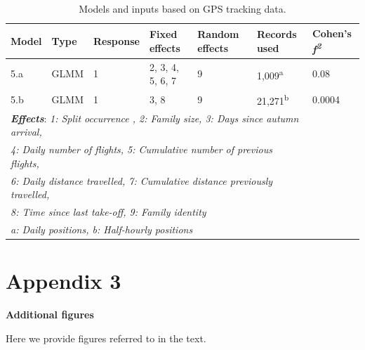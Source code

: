 \documentclass[10pt,twocolumn]{paper}
\begin{document}
\begin{table}[H]
\begin{tabular}{l*6l}
\toprule
Model & Type & Response & Fixed effects & Random effects & Records used & Cohen's \emph{f\textsuperscript{2}}\\
\midrule
5.a & GLMM & 1 & 2, 3, 4, 5, 6, 7 & 9 & 1,009\textsuperscript{a} & 0.08 \\

5.b & GLMM & 1 & 3, 8 & 9 & 21,271\textsuperscript{b} & 0.0004\\
\midrule
\multicolumn{6}{l}{\textbf{\emph{Effects}}: \emph{1: Split occurrence , 2: Family size, 3: Days since autumn arrival,}}\\
\multicolumn{6}{l}{\emph{4: Daily number of flights, 5: Cumulative number of previous flights,}}\\
\multicolumn{6}{l}{\emph{6: Daily distance travelled, 7: Cumulative distance previously travelled,}}\\
\multicolumn{6}{l}{\emph{8: Time since last take-off, 9: Family identity}}\\
\midrule
\multicolumn{6}{l}{\emph{a: Daily positions, b: Half-hourly positions}}\\
\bottomrule
\end{tabular}

\caption{Models and inputs based on GPS tracking data.}
\end{table}

\clearpage

\section{Appendix 3}\label{appendix-3}

\textbf{Additional figures}

Here we provide figures referred to in the text.
\end{document}
